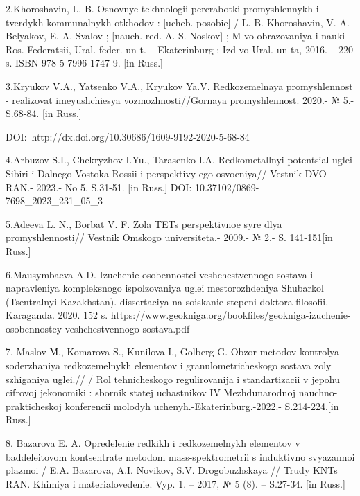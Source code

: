 2.Khoroshavin, L. B. Osnovnye tekhnologii pererabotki promyshlennykh i
tverdykh kommunal\textquotesingle nykh otkhodov : {[}ucheb. posobie{]} /
L. B. Khoroshavin, V. A. Belyakov, E. A. Svalov ; {[}nauch. red. A. S.
Noskov{]} ; M-vo obrazovaniya i nauki Ros. Federatsii, Ural. feder.
un-t. -- Ekaterinburg : Izd-vo Ural. un-ta, 2016. -- 220 s. ISBN
978-5-7996-1747-9. {[}in Russ.{]}

3.Kryukov V.A., Yatsenko V.A., Kryukov Ya.V.
Redkozemel\textquotesingle naya promyshlennost\textquotesingle{} -
realizovat\textquotesingle{} imeyushchiesya vozmozhnosti//Gornaya
promyshlennost\textquotesingle. 2020.- № 5.-S.68-84. {[}in Russ.{]}

DOI:~http://dx.doi.org/10.30686/1609-9192-2020-5-68-84

4.Arbuzov S.I., Chekryzhov I.Yu., Tarasenko I.A.
Redkometall\textquotesingle nyi potentsial uglei Sibiri i
Dal\textquotesingle nego Vostoka Rossii i perspektivy ego osvoeniya//
Vestnik DVO RAN.- 2023.- No 5. S.31-51. {[}in Russ.{]} DOI:
10.37102/0869-7698\_2023\_231\_05\_3

5.Adeeva L. N., Borbat V. F. Zola TETs perspektivnoe
syr\textquotesingle e dlya promyshlennosti// Vestnik Omskogo
universiteta.- 2009.- № 2.- S. 141-151{[}in Russ.{]}

6.Mausymbaeva A.D. Izuchenie osobennostei veshchestvennogo sostava i
napravleniya kompleksnogo ispol\textquotesingle zovaniya uglei
mestorozhdeniya Shubarkol\textquotesingle{}
(Tsentral\textquotesingle nyi Kazakhstan). dissertaciya na soiskanie
stepeni doktora filosofii. Karaganda. 2020. 152 s.
https://www.geokniga.org/bookfiles/geokniga-izuchenie-osobennostey-veshchestvennogo-sostava.pdf

7. Maslov М., Komarova S., Kunilova I., Gol\textquotesingle berg G.
Obzor metodov kontrolya soderzhaniya redkozemel\textquotesingle nykh
elementov i granulometricheskogo sostava zoly szhiganiya uglei.// /
Rol\textquotesingle{} tehnicheskogo regulirovanija i standartizacii v
jepohu cifrovoj jekonomiki : sbornik statej uchastnikov IV
Mezhdunarodnoj nauchno-prakticheskoj konferencii molodyh
uchenyh.-Ekaterinburg.-2022.- S.214-224.{[}in Russ.{]}

8. Bazarova E. A. Opredelenie redkikh i redkozemel\textquotesingle nykh
elementov v baddeleitovom kontsentrate metodom mass-spektrometrii s
induktivno svyazannoi plazmoi / E.A. Bazarova, A.I. Novikov, S.V.
Drogobuzhskaya // Trudy KNTs RAN. Khimiya i materialovedenie. Vyp. 1. --
2017, № 5 (8). -- S.27-34. {[}in Russ.{]}

